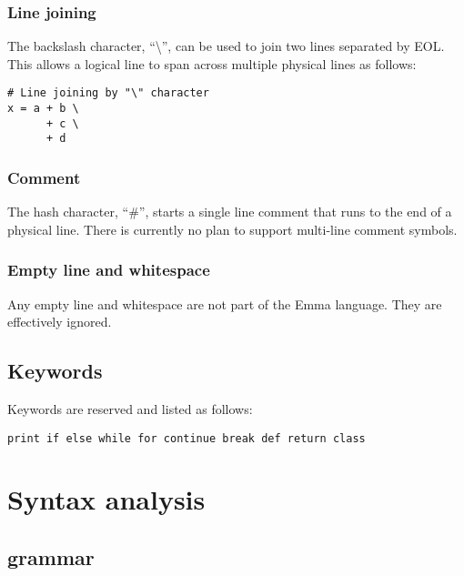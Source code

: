 \documentclass[10pt,a4paper]{article}
\begin{document}
\subsubsection{Line joining}
The backslash character, ``\textbackslash'', can be used to join two lines 
separated by EOL.
This allows a logical line to span across multiple physical lines as follows:
\begin{lstlisting}
# Line joining by "\" character
x = a + b \
      + c \
      + d
\end{lstlisting}

\subsubsection{Comment}
The hash character, ``\#'', starts a single line comment that runs to the end
of a physical line. There is currently no plan to support multi-line
comment symbols.

\subsubsection{Empty line and whitespace}
Any empty line and whitespace are not part of the Emma language. They are
effectively ignored.

\subsection{Keywords}
Keywords are reserved and listed as follows:
\begin{lstlisting}
print if else while for continue break def return class
\end{lstlisting}

\pagebreak


\section{Syntax analysis}
\subsection{grammar}

\setlength{\grammarparsep}{10pt plus 1pt minus 1pt} %
\setlength{\grammarindent}{12em} %
\end{document}
